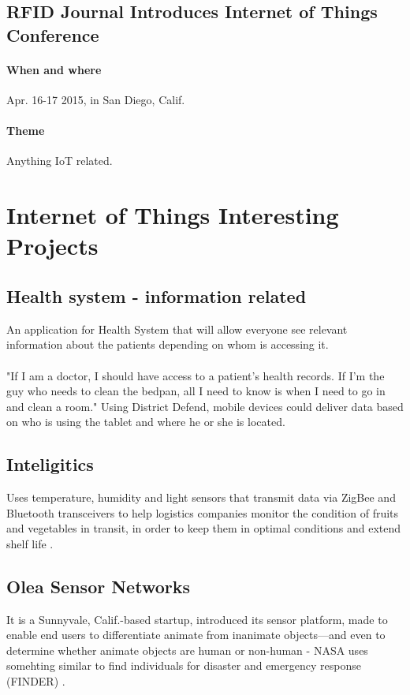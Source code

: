 \documentclass[12pt]{article}
\begin{document}
\subsection {RFID Journal Introduces Internet of Things Conference}
\paragraph {When and where} Apr. 16-17 2015, in San Diego, Calif.
\paragraph {Theme} Anything IoT related.

\section{Internet of Things Interesting Projects}

\subsection{Health system - information related} An application for Health System that will allow everyone see relevant information about the patients depending on whom is accessing it.
\paragraph {} "If I am a doctor, I should have access to a patient's health records. If I'm the guy who needs to clean the bedpan, all I need to know is when I need to go in and clean a room." Using District Defend, mobile devices could deliver data based on who is using the tablet and where he or she is located.

 \subsection{Inteligitics} Uses temperature, humidity and light sensors that transmit data via ZigBee and Bluetooth transceivers to help logistics companies monitor the condition of fruits and vegetables in transit, in order to keep them in optimal conditions and extend shelf life \cite {notes}.

  \subsection {Olea Sensor Networks} It is a Sunnyvale, Calif.-based startup, introduced its sensor platform, made to enable end users to differentiate animate from inanimate objects—and even to determine whether animate objects are human or non-human -  NASA uses somehting similar to find individuals for disaster and emergency response (FINDER) \cite {olea}.
\end{document}
